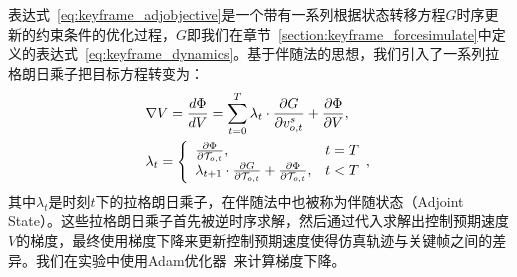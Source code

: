 表达式~\ref{eq:keyframe_adjobjective}是一个带有一系列根据状态转移方程$G$时序更新的约束条件的优化过程，$G$即我们在章节~\ref{section:keyframe_forcesimulate}中定义的表达式~\ref{eq:keyframe_dynamics}。基于伴随法的思想，我们引入了一系列拉格朗日乘子把目标方程转变为：
\begin{equation}
\setlength\abovedisplayskip{10pt}
\setlength\belowdisplayskip{10pt}
\label{eq:keyframe_adjreverse}
\begin{aligned}
    & \nabla{V} = \frac{d\Phi}{dV} = \sum_{t=0}^T \lambda_t \cdot \frac{\partial G}{\partial v^s_{o,t}} + \frac{\partial \Phi}{\partial V} ,\\
    & \lambda_t = \left\{
        \begin{array}{lr}
        \frac{\partial \Phi}{\partial \mathcal{T}_{o,t}},  & t = T \\
       \lambda_{t+1} \cdot \frac{\partial G}{\partial \mathcal{T}_{o,t}} + \frac{\partial \Phi}{\partial \mathcal{T}_{o,t}}, & t < T
        \end{array},
    \right.
\end{aligned}
\end{equation}
其中$\lambda_t$是时刻$t$下的拉格朗日乘子，在伴随法中也被称为伴随状态（Adjoint State）。这些拉格朗日乘子首先被逆时序求解，然后通过代入求解出控制预期速度$V$的梯度，最终使用梯度下降来更新控制预期速度使得仿真轨迹与关键帧之间的差异。我们在实验中使用Adam优化器~\cite{kingma2014adam}来计算梯度下降。

